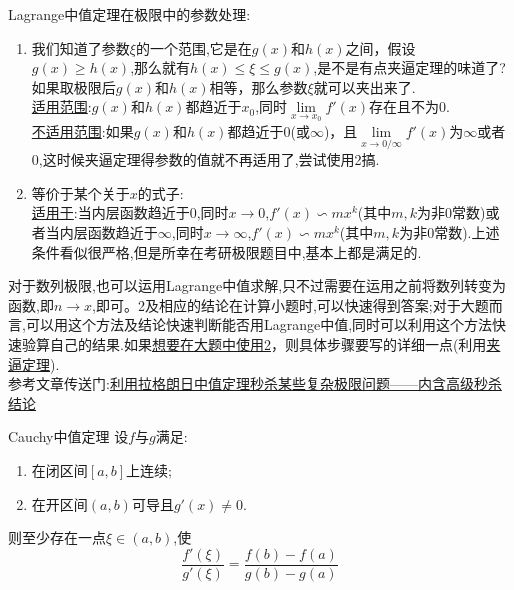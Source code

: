 \begin{note}
	Lagrange中值定理在极限中的参数处理:
	\begin{enumerate}
		\item 我们知道了参数$\xi$的一个范围,它是在$g(x)$和$h(x)$之间，假设$g(x)\ge h(x)$,那么就有$h(x)\le \xi \le g(x)$,是不是有点夹逼定理的味道了?如果取极限后$g(x)$和$h(x)$相等，那么参数$\xi$就可以夹出来了.\\\underline{适用范围}:$g(x)$和$h(x)$都趋近于$x_0$,同时$
			      \lim\limits_{x\rightarrow x_0}f'\left( x \right)
		      $存在且不为$0$.\\\underline{不适用范围}:如果$g(x)$和$h(x)$都趋近于$0$(或$\infty$)，且$
			      \lim\limits_{x\rightarrow 0/\infty}f'\left( x \right)
		      $为$\infty$或者$0$,这时候夹逼定理得参数的值就不再适用了,尝试使用2搞.
		\item 等价于某个关于$x$的式子:\\
		      \underline{适用于}:当内层函数趋近于$0$,同时$x\rightarrow 0$,$f'\left( x \right) \backsim mx^k$(其中$m,k$为非$0$常数)或者当内层函数趋近于$\infty$,同时$x\rightarrow \infty$,$f'\left( x \right) \backsim mx^k$(其中$m,k$为非$0$常数).上述条件看似很严格,但是所幸在考研极限题目中,基本上都是满足的.
	\end{enumerate}
	对于数列极限,也可以运用Lagrange中值求解,只不过需要在运用之前将数列转变为函数,即$n \rightarrow x$,即可。2及相应的结论在计算小题时,可以快速得到答案;对于大题而言,可以用这个方法及结论快速判断能否用Lagrange中值,同时可以利用这个方法快速验算自己的结果.如果\underline{想要在大题中使用2}，则具体步骤要写的详细一点(利用\underline{夹逼定理}).\\
	参考文章传送门:\href{https://zhuanlan.zhihu.com/p/368192940}{利用拉格朗日中值定理秒杀某些复杂极限问题——内含高级秒杀结论}
\end{note}

\begin{theorem}{Cauchy中值定理} \label{thm:Cauchy_middle_theorem}
	设$f$与$g$满足:
	\begin{enumerate}
		\item 在闭区间$\left[ a,b \right] $上连续;
		\item 在开区间$\left( a,b \right) $可导且$g'\left( x \right) \ne 0$.
	\end{enumerate}
	则至少存在一点$\xi \in \left( a,b \right) $,使
	$$
		\frac{f'\left( \xi \right)}{g'\left( \xi \right)}=\frac{f\left( b \right) -f\left( a \right)}{g\left( b \right) -g\left( a \right)}
	$$
\end{theorem}

